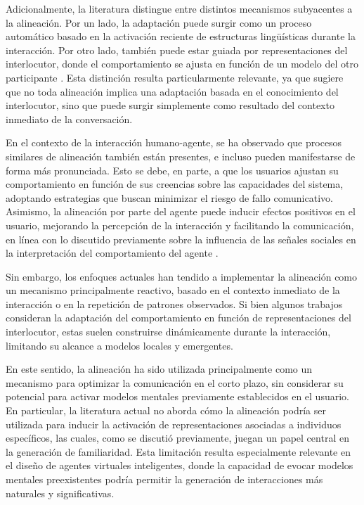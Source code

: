 \documentclass[12pt]{article}
\begin{document}
Adicionalmente, la literatura distingue entre distintos mecanismos subyacentes a la alineación. Por un lado, la adaptación puede surgir como un proceso automático basado en la activación reciente de estructuras lingüísticas durante la interacción. Por otro lado, también puede estar guiada por representaciones del interlocutor, donde el comportamiento se ajusta en función de un modelo del otro participante \cite{dubuisson_duplessis_towards_2021}. Esta distinción resulta particularmente relevante, ya que sugiere que no toda alineación implica una adaptación basada en el conocimiento del interlocutor, sino que puede surgir simplemente como resultado del contexto inmediato de la conversación.

En el contexto de la interacción humano-agente, se ha observado que procesos similares de alineación también están presentes, e incluso pueden manifestarse de forma más pronunciada. Esto se debe, en parte, a que los usuarios ajustan su comportamiento en función de sus creencias sobre las capacidades del sistema, adoptando estrategias que buscan minimizar el riesgo de fallo comunicativo. Asimismo, la alineación por parte del agente puede inducir efectos positivos en el usuario, mejorando la percepción de la interacción y facilitando la comunicación, en línea con lo discutido previamente sobre la influencia de las señales sociales en la interpretación del comportamiento del agente \cite{branigan_linguistic_2010}.

Sin embargo, los enfoques actuales han tendido a implementar la alineación como un mecanismo principalmente reactivo, basado en el contexto inmediato de la interacción o en la repetición de patrones observados. Si bien algunos trabajos consideran la adaptación del comportamiento en función de representaciones del interlocutor, estas suelen construirse dinámicamente durante la interacción, limitando su alcance a modelos locales y emergentes.

En este sentido, la alineación ha sido utilizada principalmente como un mecanismo para optimizar la comunicación en el corto plazo, sin considerar su potencial para activar modelos mentales previamente establecidos en el usuario. En particular, la literatura actual no aborda cómo la alineación podría ser utilizada para inducir la activación de representaciones asociadas a individuos específicos, las cuales, como se discutió previamente, juegan un papel central en la generación de familiaridad. Esta limitación resulta especialmente relevante en el diseño de agentes virtuales inteligentes, donde la capacidad de evocar modelos mentales preexistentes podría permitir la generación de interacciones más naturales y significativas.
\end{document}
